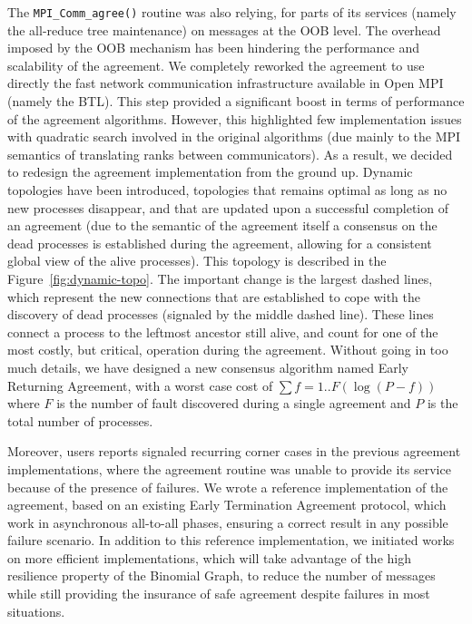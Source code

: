 The {\tt MPI\_Comm\_agree()} routine was also relying, for parts of its
services (namely the all-reduce tree maintenance) on messages at the OOB
level. The overhead imposed by the OOB mechanism has been hindering
the performance and scalability of the agreement. We completely
reworked the agreement to use directly the fast network communication
infrastructure available in Open MPI (namely the BTL). This step
provided a significant boost in terms of performance of the agreement
algorithms. However, this highlighted few implementation issues with
quadratic search involved in the original algorithms (due mainly to
the MPI semantics of translating ranks between communicators). As a
result, we decided to redesign the agreement implementation from the
ground up. Dynamic topologies have been introduced, topologies that
remains optimal as long as no new processes disappear, and that are
updated upon a successful completion of an agreement (due to the
semantic of the agreement itself a consensus on the dead processes is
established during the agreement, allowing for a consistent global
view of the alive processes). This topology is described in the Figure~\ref{fig:dynamic-topo}. The important change is the
largest dashed lines, which 
represent the new connections that are established to cope with the
discovery of dead processes (signaled by the middle dashed line). These
lines connect a process to the leftmost ancestor still alive, and
count for one of the most costly, but critical, operation during the
agreement. Without going in too much details, we have designed a new
consensus algorithm named Early Returning Agreement, with a worst case
cost of $\sum{f} = 1..F(\log(P-f))$ where $F$ is the number of fault discovered
during a single agreement and $P$ is the total number of processes.

Moreover, users reports signaled recurring corner cases in the
previous agreement implementations, where the agreement routine was
unable to provide its service because of the presence of failures. We
wrote a reference implementation of the agreement, based on an
existing Early Termination Agreement protocol, which work in
asynchronous all-to-all phases, ensuring a correct result in any
possible failure scenario. In addition to this reference
implementation, we initiated works on more efficient implementations,
which will take advantage of the high resilience property of the
Binomial Graph, to reduce the number of messages while still providing
the insurance of safe agreement despite failures in most situations.

